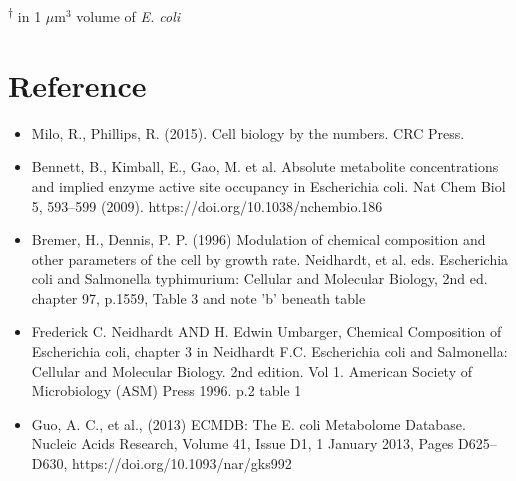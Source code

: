 \documentclass{article}
\begin{document}
            \textsuperscript{$\dagger$} in 1 $\mu$m$^{3}$ volume of \textit{E. coli}

            
            



    \section{Reference}
    \begin{itemize}
        \item Milo, R., Phillips, R. (2015). Cell biology by the numbers. CRC Press.
        \item Bennett, B., Kimball, E., Gao, M. et al. Absolute metabolite concentrations and implied enzyme active site occupancy in Escherichia coli. Nat Chem Biol 5, 593–599 (2009). https://doi.org/10.1038/nchembio.186
        \item Bremer, H., Dennis, P. P. (1996) Modulation of chemical composition and other parameters of the cell by growth rate. Neidhardt, et al. eds. Escherichia coli and Salmonella typhimurium: Cellular and Molecular Biology, 2nd ed. chapter 97, p.1559, Table 3 and note 'b' beneath table
        \item Frederick C. Neidhardt AND H. Edwin Umbarger, Chemical Composition of Escherichia coli, chapter 3 in Neidhardt F.C. Escherichia coli and Salmonella: Cellular and Molecular Biology. 2nd edition. Vol 1. American Society of Microbiology (ASM) Press 1996. p.2 table 1
        \item Guo, A. C., et al., (2013) ECMDB: The E. coli Metabolome Database. Nucleic Acids Research, Volume 41, Issue D1, 1 January 2013, Pages D625–D630, https://doi.org/10.1093/nar/gks992
    \end{itemize} 
\end{document}
